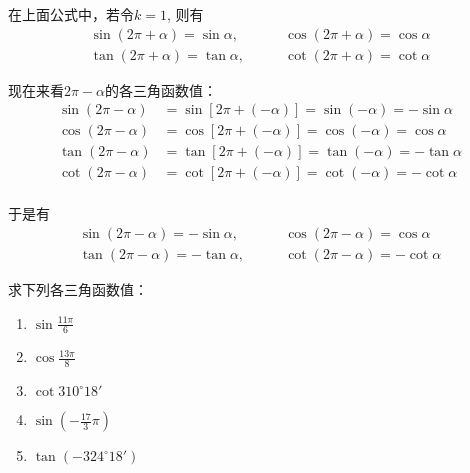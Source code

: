在上面公式中，若令$k=1$, 则有
\begin{equation}
    \begin{split}
        \sin(2\pi+\alpha)=\sin\alpha,&\qquad \cos(2\pi+\alpha)=\cos\alpha \\
    \tan(2\pi+\alpha) =\tan\alpha,&\qquad \cot(2\pi+\alpha)=\cot\alpha
    \end{split}
    \end{equation}

现在来看$2\pi-\alpha$的各三角函数值：
\[\begin{split}
    \sin(2\pi-\alpha)&=\sin[2\pi+(-\alpha)]=\sin(-\alpha)=-\sin\alpha\\
    \cos(2\pi-\alpha)&=\cos[2\pi+(-\alpha)]=\cos(-\alpha)=\cos\alpha\\
    \tan(2\pi-\alpha)&=\tan[2\pi+(-\alpha)]=\tan(-\alpha)=-\tan\alpha\\
    \cot(2\pi-\alpha)&=\cot[2\pi+(-\alpha)]=\cot(-\alpha)=-\cot\alpha\\    
\end{split}\]

于是有
\begin{equation}
    \begin{split}
        \sin(2\pi-\alpha)=-\sin\alpha,&\qquad \cos(2\pi-\alpha)=\cos\alpha \\
    \tan(2\pi-\alpha) =-\tan\alpha,&\qquad \cot(2\pi-\alpha)=-\cot\alpha
    \end{split}
    \end{equation}

\begin{example}
    求下列各三角函数值：
\begin{multicols}{3}
\begin{enumerate}
    \item $\sin\frac{11\pi}{6}$
    \item $\cos\frac{13\pi}{8}$
    \item $\cot310^{\circ}18'$
    \item $\sin\left(-\frac{17}{3}\pi\right)$
    \item $\tan(-324^{\circ}18')$
\end{enumerate}
\end{multicols}
\end{example}

